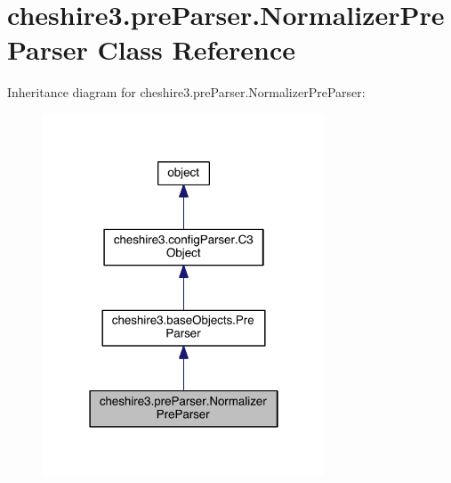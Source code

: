 \hypertarget{classcheshire3_1_1pre_parser_1_1_normalizer_pre_parser}{\section{cheshire3.\-pre\-Parser.\-Normalizer\-Pre\-Parser Class Reference}
\label{classcheshire3_1_1pre_parser_1_1_normalizer_pre_parser}
}


Inheritance diagram for cheshire3.\-pre\-Parser.\-Normalizer\-Pre\-Parser\-:
\nopagebreak
\begin{figure}[H]
\begin{center}
\leavevmode
\includegraphics[width=238pt]{classcheshire3_1_1pre_parser_1_1_normalizer_pre_parser__inherit__graph}
\end{center}
\end{figure}


